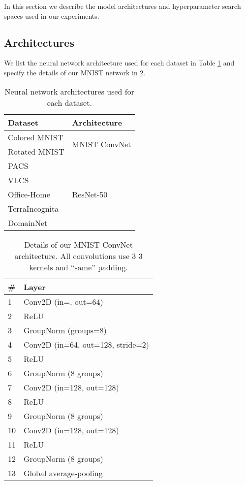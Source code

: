 \documentclass{article}
\begin{document}
In this section we describe the model architectures and hyperparameter search spaces used in our experiments.

\subsection{Architectures}

We list the neural network architecture used for each dataset in Table \ref{table:architectures} and specify the details of our MNIST network in \ref{table:mnist_convnet}.

\begin{minipage}{0.45\textwidth}
    \begin{table}[H]
    \caption{Neural network architectures used for each dataset.} 
\begin{tabular}{ll}
        \toprule
        \textbf{Dataset} & \textbf{Architecture} \\
        \midrule
        Colored MNIST & \multirow{2}{*}{MNIST ConvNet} \\
        Rotated MNIST & \\
        \midrule
        PACS & \multirow{5}{*}{ResNet-50} \\
        VLCS & \\
        Office-Home &  \\
        TerraIncognita &  \\
        DomainNet &  \\
        \bottomrule
        \end{tabular}
\label{table:architectures}
\end{table}
\end{minipage}
\hfill
\begin{minipage}{0.48\textwidth}
\begin{table}[H]
    \caption{Details of our MNIST ConvNet architecture. All convolutions use 3  3 kernels and ``same'' padding.} 
\begin{tabular}{ll}
        \toprule
        \textbf{\#} & \textbf{Layer}\\
        \midrule
            1  & Conv2D (in=, out=64)\\
            2  & ReLU\\
            3  & GroupNorm (groups=8)\\
            4  & Conv2D (in=64, out=128, stride=2)\\
            5  & ReLU\\
            6  & GroupNorm (8 groups)\\
            7  & Conv2D (in=128, out=128)\\
            8  & ReLU\\
            9  & GroupNorm (8 groups)\\
            10 & Conv2D (in=128, out=128)\\
            11 & ReLU\\
            12 & GroupNorm (8 groups)\\
            13 & Global average-pooling\\
        \bottomrule
        \end{tabular}
\label{table:mnist_convnet}
\end{table}
\end{minipage}
\end{document}
